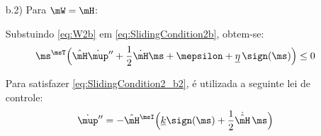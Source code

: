 \documentclass[]{politex}
\begin{document}
\begin{itemize}
\begin{itemize}
Portanto, se a seguinte inequa\c{c}\~ao matricial for respeitada:
\begin{equation} \label{eq:DesigualdadeK2_b1}
\begin{split}
(\mone - | \mH^\msI \tilde{\mH}|_{max} ) \cdot \diag(\underline{k})  \geq \diag(\underline{\eta}) + |\mH^\msI ( \dot{\mH} \mH^\msI \tilde{\mH} -\dot{\tilde{\mH}}) |_{max} | \mup'' -\msigma|  + \\ |\mH^\msI \tilde{\mH}|_{max}| \dot{\msigma}| + |\mH^\msI \dot{\mH} \mH^\msI  \tilde{\mh}|_{max}+ |\mH^\msI \dot{\tilde{\mh}}|_{max}
\end{split}
\end{equation}

\eqref{eq:DesigualdadeK1b1} ser\'a respeitada, o que garante que a condi\c{c}\~ao de escorregamento \eqref{eq:SlidingCondition} tamb\'em seja respeitada e consequentemente garante a converg\^encia do erro de controle para zero.

Existe solu\c{c}\~ao para \eqref{eq:DesigualdadeK2_b1} apenas se a matriz $\mone - | \mH^\msI \tilde{\mH}|_{max}$ for uma \emph{M-matrix}, ou seja, se módulo do maior autovalor de $| \mH^\msI \tilde{\mH}|_{max}$ for menor que $1$. Se este for o caso, a solução que minimiza a norma de $\diag(\underline{k})$ é dada por:
\begin{equation} \label{eq:MatrizDiagk_b1}
\begin{split}
\diag(\underline{k})  = (\mone - | \mH^\msI \tilde{\mH}|_{max} )^\msI (\diag(\underline{\eta}) + |\mH^\msI ( \dot{\mH} \mH^\msI \tilde{\mH} -\dot{\tilde{\mH}}) |_{max} | \mup'' -\msigma|  + \\ |\mH^\msI \tilde{\mH}|_{max}| \dot{\msigma}| + |\mH^\msI \dot{\mH} \mH^\msI  \tilde{\mh}|_{max}+ |\mH^\msI \dot{\tilde{\mh}}|_{max}
\end{split}
\end{equation}

\item[b.2)] Para $\mW = \mH$:


Substuindo \eqref{eq:W2b} em \eqref{eq:SlidingCondition2b}, obtem-se:
\begin{equation} \label{eq:SlidingCondition2_b2}
\ms^\msT \Big( \hat{\mH} \dot{\mup}'' + \frac{1}{2} \dot{\mH} \ms  + \mepsilon + \underline{\eta} \, \sign(\ms) \Big) \leq 0
\end{equation}

Para satisfazer \eqref{eq:SlidingCondition2_b2}, é utilizada a seguinte lei de controle:
\begin{equation} \label{eq:ControlLawSRed_b2}
\dot{\mup}'' =  - \hat{\mH}^\msI \Big( \underline{k} \sign(\ms) +  \frac{1}{2} \dot{\hat{\mH}} \, \ms \Big) 
\end{equation}


\end{itemize}
\end{itemize}
\end{document}
